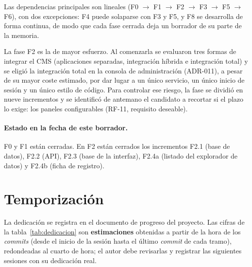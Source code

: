 Las dependencias principales son lineales (F0 $\rightarrow$ F1 $\rightarrow$
F2 $\rightarrow$ F3 $\rightarrow$ F5 $\rightarrow$ F6), con dos excepciones:
F4 puede solaparse con F3 y F5, y F8 se desarrolla de forma continua, de modo
que cada fase cerrada deja un borrador de su parte de la memoria.

La fase F2 es la de mayor esfuerzo. Al comenzarla se evaluaron tres formas de
integrar el CMS (aplicaciones separadas, integración híbrida e integración
total) y se eligió la integración total en la consola de administración
(ADR-011), a pesar de su mayor coste estimado, por dar lugar a un único
servicio, un único inicio de sesión y un único estilo de código. Para
controlar ese riesgo, la fase se dividió en nueve incrementos y se identificó
de antemano el candidato a recortar si el plazo lo exige: los paneles
configurables (RF-11, requisito deseable).

\paragraph{Estado en la fecha de este borrador.}
F0 y F1 están cerradas. En F2 están cerrados los incrementos F2.1 (base de
datos), F2.2 (API), F2.3 (base de la interfaz), F2.4a (listado del explorador
de datos) y F2.4b (ficha de registro).

\section{Temporización}
\label{sec:temporizacion}

La dedicación se registra en el documento de progreso del proyecto. Las cifras
de la tabla~\ref{tab:dedicacion} son \textbf{estimaciones} obtenidas a partir
de la hora de los \textit{commits} (desde el inicio de la sesión hasta el
último \textit{commit} de cada tramo), redondeadas al cuarto de hora; el autor
debe revisarlas y registrar las siguientes sesiones con su dedicación real.

